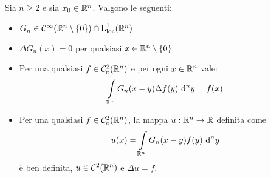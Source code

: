 \documentclass{book}
\begin{document}
\begin{theorem}{}{}
    Sia $n\ge 2$ e sia $x_0 \in \mathbb{R}^n$. Valgono le seguenti:\begin{itemize}
        \item $G_n \in \mathcal{C}^\infty(\mathbb{R}^n \setminus \{0\})\cap \operatorname{L}_{\text{loc}}^1(\mathbb{R}^n)$
        \item $\Delta G_n(x) = 0$ per qualsiasi $x \in \mathbb{R}^n \setminus \{0\}$
        \item Per una qualsiasi $f\in\mathcal{C}^2_c(\mathbb{R}^n)$ e per ogni $x \in \mathbb{R}^n$ vale:
        \[\int\limits_{\mathbb{R}^n}G_n(x-y)\Delta f(y) \text{ d}^n y = f(x)\]
        \item Per una qualsiasi $f\in\mathcal{C}^2_c(\mathbb{R}^n)$, la mappa $u:\mathbb{R}^n\to\mathbb{R}$ definita come
        \[u(x) = \int\limits_{\mathbb{R}^n} G_n(x-y)f(y)\text{ d}^n y\]
        è ben definita, $u\in \mathcal{C}^2(\mathbb{R}^n)$ e $\Delta u = f$. 
    \end{itemize}
\end{theorem}
\end{document}
